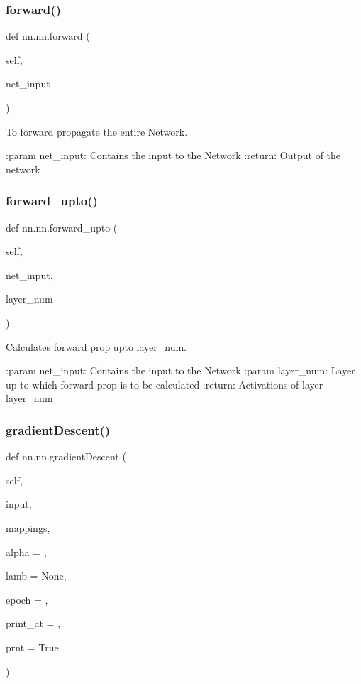 \subsubsection{\texorpdfstring{forward()}{forward()}}
{\footnotesize\ttfamily def nn.\+nn.\+forward (\begin{DoxyParamCaption}\item[{}]{self,  }\item[{}]{net\+\_\+input }\end{DoxyParamCaption})}

\begin{DoxyVerb}To forward propagate the entire Network.

:param net_input: Contains the input to the Network
:return: Output of the network
\end{DoxyVerb}
 \mbox{\label{classnn_1_1nn_ac3d2b61ed992dc615eacda8e75a61a2b}} 
\subsubsection{\texorpdfstring{forward\+\_\+upto()}{forward\_upto()}}
{\footnotesize\ttfamily def nn.\+nn.\+forward\+\_\+upto (\begin{DoxyParamCaption}\item[{}]{self,  }\item[{}]{net\+\_\+input,  }\item[{}]{layer\+\_\+num }\end{DoxyParamCaption})}

\begin{DoxyVerb}Calculates forward prop upto layer_num.

:param net_input: Contains the input to the Network
:param layer_num: Layer up to which forward prop is to be calculated
:return: Activations of layer layer_num
\end{DoxyVerb}
 \mbox{\label{classnn_1_1nn_ae8db320c8333323d55f67c1e77c0128e}} 
\subsubsection{\texorpdfstring{gradient\+Descent()}{gradientDescent()}}
{\footnotesize\ttfamily def nn.\+nn.\+gradient\+Descent (\begin{DoxyParamCaption}\item[{}]{self,  }\item[{}]{input,  }\item[{}]{mappings,  }\item[{}]{alpha = {},  }\item[{}]{lamb = {\ttfamily None},  }\item[{}]{epoch = {},  }\item[{}]{print\+\_\+at = {},  }\item[{}]{prnt = {\ttfamily True} }\end{DoxyParamCaption})}

